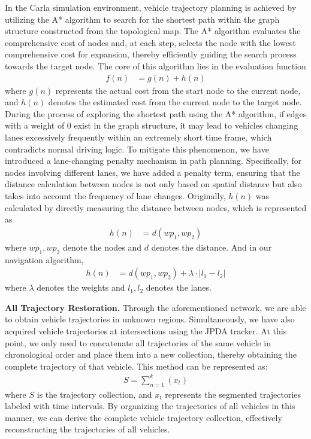 In the Carla simulation environment, vehicle trajectory planning is achieved by utilizing the A* algorithm to search for the shortest path within the graph structure constructed from the topological map. 
The A* algorithm evaluates the comprehensive cost of nodes and, at each step, selects the node with the lowest comprehensive cost for expansion, thereby efficiently guiding the search process towards the target node. 
The core of this algorithm lies in the evaluation function 
\begin{align}
	\mathit{f}(n) & = g(n)+h(n)
\end{align}
where $\mathit{g}(n)$ represents the actual cost from the start node to the current node, and $\mathit{h}(n)$ denotes the estimated cost from the current node to the target node.
During the process of exploring the shortest path using the A* algorithm, if edges with a weight of 0 exist in the graph structure, it may lead to vehicles changing lanes excessively frequently within an extremely short time frame, which contradicts normal driving logic. 
To mitigate this phenomenon, we have introduced a lane-changing penalty mechanism in path planning. 
Specifically, for nodes involving different lanes, we have added a penalty term, ensuring that the distance calculation between nodes is not only based on spatial distance but also takes into account the frequency of lane changes. 
Originally, $\mathit{h}(n)$ was calculated by directly measuring the distance between nodes, which is represented as
\begin{align}
	\mathit{h}(n) & = d\left(w p_{1}, w p_{2}\right)
\end{align}
where $w p_{1}, w p_{2}$ denote the nodes and $d$ denotes the distance. 
And in our navigation algorithm,
\begin{align}
	\mathit{h}(n) & = d\left(w p_{1}, w p_{2}\right)+\lambda \cdot\left|l_{1}-l_{2}\right|
\end{align}
where $\lambda$ denotes the weights and $l_{1}, l_{2}$ denotes the lanes.


\textbf{All Trajectory Restoration.}
Through the aforementioned network, we are able to obtain vehicle trajectories in unknown regions. 
Simultaneously, we have also acquired vehicle trajectories at intersections using the JPDA tracker. 
At this point, we only need to concatenate all trajectories of the same vehicle in chronological order and place them into a new collection, thereby obtaining the complete trajectory of that vehicle. 
This method can be represented as: 
\begin{align}
	S = \sum_{n = 1}^{k} \left ( x_{t}  \right ) 
\end{align}
where $S$ is the trajectory collection, and $x_{t}$ represents the segmented trajectories labeled with time intervals. 
By organizing the trajectories of all vehicles in this manner, we can derive the complete vehicle trajectory collection, effectively reconstructing the trajectories of all vehicles.

